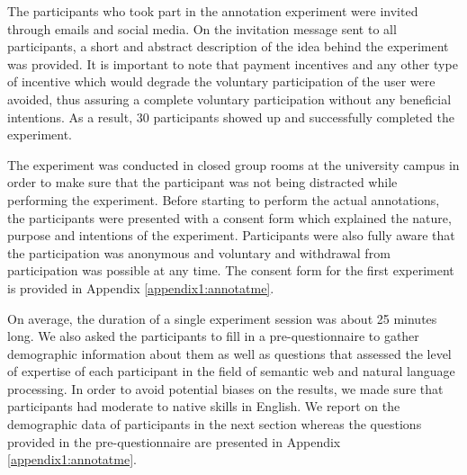 The participants who took part in the annotation experiment were invited through emails and social media. On the invitation message sent to all participants, a short and abstract description of the idea behind the experiment was provided. It is important to note that payment incentives and any other type of incentive which would degrade the voluntary participation of the user were avoided, thus assuring a complete voluntary participation without any beneficial intentions. As a result, 30 participants showed up and successfully completed the experiment.

The experiment was conducted in closed group rooms at the university campus in order to make sure that the participant was not being distracted while performing the experiment. Before starting to perform the actual annotations, the participants were presented with a consent form which explained the nature, purpose and intentions of the experiment. Participants were also fully aware that the participation was anonymous and voluntary and withdrawal from participation was possible at any time. The consent form for the first experiment is provided in Appendix \ref{appendix1:annotatme}.

On average, the duration of a single experiment session was about 25 minutes long. We also asked the participants to fill in a pre-questionnaire to gather demographic information about them as well as questions that assessed the level of expertise of each participant in the field of semantic web and natural language processing. In order to avoid potential biases on the results, we made sure that participants had moderate to native skills in English. We report on the demographic data of participants in the next section whereas the questions provided in the pre-questionnaire are presented in Appendix \ref{appendix1:annotatme}.

